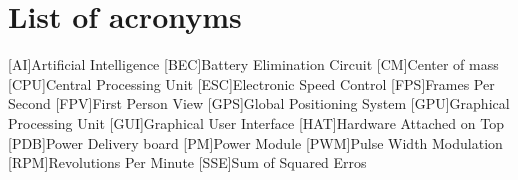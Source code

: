 \chapter*{List of acronyms}
\begin{acronym} 
    [AI]{Artificial Intelligence}
    [BEC]{Battery Elimination Circuit}
    [CM]{Center of mass}
    [CPU]{Central Processing Unit}
    [ESC]{Electronic Speed Control}
    [FPS]{Frames Per Second}
    [FPV]{First Person View}
    [GPS]{Global Positioning System}
    [GPU]{Graphical Processing Unit}
    [GUI]{Graphical User Interface}
    [HAT]{Hardware Attached on Top}
    [PDB]{Power Delivery board}
    [PM]{Power Module}
    [PWM]{Pulse Width Modulation}
    [RPM]{Revolutions Per Minute}
    [SSE]{Sum of Squared Erros}
\end{acronym}